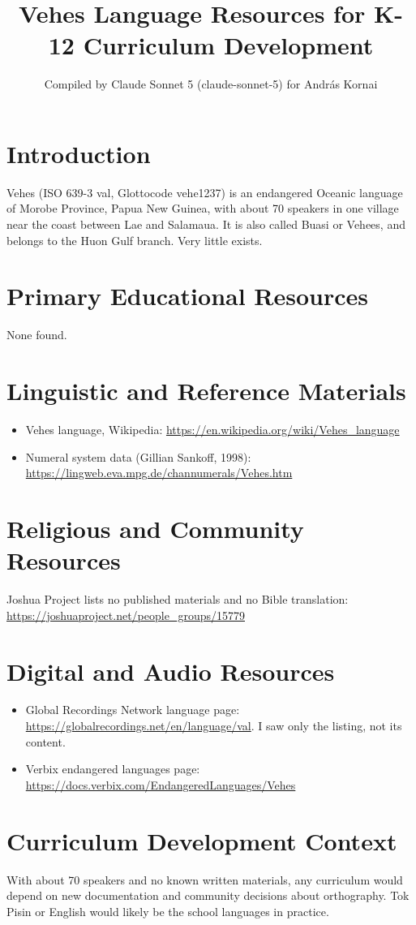 \documentclass[12pt]{article}
\title{Vehes Language Resources for K-12 Curriculum Development}
\author{Compiled by Claude Sonnet 5 (claude-sonnet-5) for Andr\'as Kornai}
\date{}
\begin{document}
\maketitle
\section{Introduction}
Vehes (ISO 639-3 val, Glottocode vehe1237) is an endangered Oceanic language of Morobe Province, Papua New Guinea, with about 70 speakers in one village near the coast between Lae and Salamaua. It is also called Buasi or Vehees, and belongs to the Huon Gulf branch. Very little exists.
\section{Primary Educational Resources}
None found.
\section{Linguistic and Reference Materials}
\begin{itemize}
\item Vehes language, Wikipedia: \url{https://en.wikipedia.org/wiki/Vehes_language}
\item Numeral system data (Gillian Sankoff, 1998): \url{https://lingweb.eva.mpg.de/channumerals/Vehes.htm}
\end{itemize}
\section{Religious and Community Resources}
Joshua Project lists no published materials and no Bible translation: \url{https://joshuaproject.net/people_groups/15779}
\section{Digital and Audio Resources}
\begin{itemize}
\item Global Recordings Network language page: \url{https://globalrecordings.net/en/language/val}. I saw only the listing, not its content.
\item Verbix endangered languages page: \url{https://docs.verbix.com/EndangeredLanguages/Vehes}
\end{itemize}
\section{Curriculum Development Context}
With about 70 speakers and no known written materials, any curriculum would depend on new documentation and community decisions about orthography. Tok Pisin or English would likely be the school languages in practice.
\end{document}
